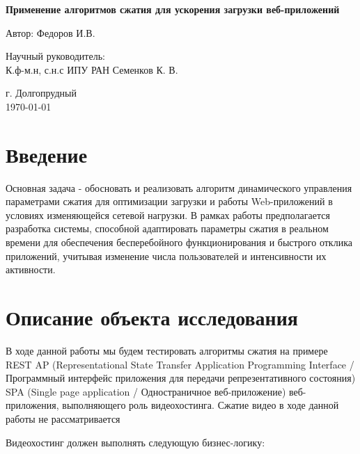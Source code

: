\documentclass[12pt]{article}
\begin{document}
\begin{titlepage}
    \centering
    \vspace*{2cm}

    {\LARGE\bfseries Применение алгоритмов сжатия для ускорения загрузки веб-приложений\par}
    \vspace{1cm}

    {\large Автор: Федоров И.В.\par}
    \vspace{1.5cm}

    {\large Научный руководитель: \\ К.ф-м.н, с.н.с ИПУ РАН Семенков К. В.\par}
    \vspace{2cm}

    {\large г. Долгопрудный \\ \today\par}

\end{titlepage}

\tableofcontents

\newpage

\section{Введение}
Основная задача - обосновать и реализовать алгоритм динамического управления параметрами сжатия для оптимизации загрузки и работы Web-приложений в условиях изменяющейся сетевой нагрузки.
В рамках работы предполагается разработка системы, способной адаптировать параметры сжатия в реальном времени для обеспечения бесперебойного функционирования и быстрого отклика приложений,
учитывая изменение числа пользователей и интенсивности их активности.

\section{Описание объекта исследования}

В ходе данной работы мы будем тестировать алгоритмы сжатия на примере REST AP
(Representational State Transfer Application Programming Interface / Программный интерфейс приложения для передачи репрезентативного состояния)
SPA (Single page application / Одностраничное веб-приложение) веб-приложения, выполняющего роль видеохостинга.
Сжатие видео в ходе данной работы не рассматривается

Видеохостинг должен выполнять следующую бизнес-логику:
\end{document}
